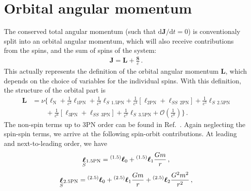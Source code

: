 \documentclass[
superscriptaddress,
preprint,
prd,tightenlines,showpacs,nofootinbib,
eqsecnum,
amsfonts,amsmath,amssymb]{revtex4-1}
\newcommand{\ud}{\mathrm{d}}
\begin{document}
\section{Orbital angular momentum}
\label{app:angmom}

The conserved total angular momentum (such that $\ud \mathbf{J}/\ud t
= 0$) is conventionaly split into an orbital angular momentum, which
will also receive contributions from the spins, and the sum of spins
of the system:
%
\begin{align}
\mathbf{J}=\mathbf{L} +\frac{\mathbf{S} }{c}\,. 
\end{align}
%
This actually represents the definition of the orbital angular
momentum $\mathbf{L}$, which depends on the choice of variables for
the individual spins. With this definition, the structure of the
orbital part is
%
\begin{align}\label{ListructCM}
\mathbf{L} &=\nu\bigg\{
\boldsymbol\ell_\mathrm{N}+\frac{1}{c^2}\boldsymbol\ell_\mathrm{1PN}+\frac{1}{c^3}
\mathop{\boldsymbol\ell}_{S} {}_{\!\mathrm{1.5PN}}
+\frac{1}{c^4}\left[\boldsymbol\ell_\mathrm{2PN}+
\mathop{\boldsymbol\ell}_{SS}{}_{\!\mathrm{2PN}}\right]
+\frac{1}{c^5} \mathop{\boldsymbol\ell}_{S}{}_{\!\mathrm{2.5PN}} \nonumber\\
& \qquad + \frac{1}{c^6}\left[\boldsymbol\ell_\mathrm{3PN}+
\mathop{\boldsymbol\ell}_{SS}{}_{\!\mathrm{3PN}}\right] + 
\frac{1}{c^7} \mathop{\boldsymbol\ell}_{S}{}_{\!\mathrm{3.5PN}} + 
\mathcal{O}\left(\frac{1}{c^8}\right)\bigg\} \,.
\end{align}
%
The non-spin terms up to 3PN order can be found in
Ref.~\cite{Blanchet2003}. Again neglecting the spin-spin terms, we
arrive at the following spin-orbit contributions. At leading and
next-to-leading order, we have
%
\begin{subequations}
\begin{align}
\mathop{\bm{\ell}}_{S}{}_{\!\mathrm{1.5PN}}={}^{(1.5)}\bm{\ell}_0+
{}^{(1.5)}\bm{\ell}_1 \frac{G m}{r}\, ,
\end{align}
%
\noindent
\end{subequations}
%
\begin{subequations}
\begin{align}
\mathop{\boldsymbol\ell}_{S}{}_{\!\mathrm{2.5PN}}=
{}^{(2.5)}\mathbf{\boldsymbol\ell}_0
+{}^{(2.5)}\mathbf{\boldsymbol\ell}_1 \frac{G m}{r}
+{}^{(2.5)}\mathbf{\boldsymbol\ell}_2 \frac{G^2 m^2}{r^2} \, ,
\end{align}
%
\noindent
\end{subequations}
\end{document}
